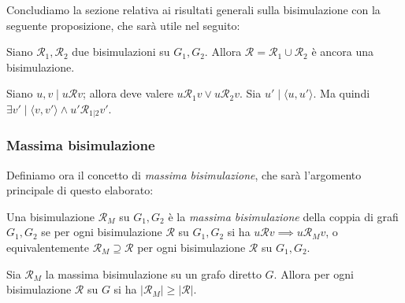 Concludiamo la sezione relativa ai risultati generali sulla bisimulazione con la seguente proposizione, che sarà utile nel seguito:
\begin{proposition}
    Siano $\mathcal{R}_1, \mathcal{R}_2$ due bisimulazioni su $G_1, G_2$. Allora $\mathcal{R} = \mathcal{R}_1 \cup \mathcal{R}_2$ è ancora una bisimulazione.
    \label{obs:bisimulation_union}
\end{proposition}
\begin{proof2}
    Siano $u,v \mid u \mathcal{R} v$; allora deve valere $u \mathcal{R}_1 v \lor u \mathcal{R}_2 v$. Sia $u' \mid \langle u, u' \rangle$. Ma quindi $\exists v' \mid \langle v,v' \rangle \land u' \mathcal{R}_{1|2} v'$.
\end{proof2}

\subsubsection{Massima bisimulazione}
\label{sec:bisi_max}
Definiamo ora il concetto di \emph{massima bisimulazione}, che sarà l'argomento principale di questo elaborato:
\begin{definition}
    Una bisimulazione $\mathcal{R}_M$ su $G_1, G_2$ è la \emph{massima bisimulazione} della coppia di grafi $G_1, G_2$ se per ogni bisimulazione $\mathcal{R}$ su $G_1,G_2$ si ha $u \mathcal{R} v \implies u \mathcal{R}_M v$, o equivalentemente $\mathcal{R}_M \supseteq \mathcal{R}$ per ogni bisimulazione $\mathcal{R}$ su $G_1, G_2$.
\end{definition}

\begin{observation}
    Sia $\mathcal{R}_M$ la massima bisimulazione su un grafo diretto $G$. Allora per ogni bisimulazione $\mathcal{R}$ su $G$ si ha $|\mathcal{R}_M| \geq |\mathcal{R}|$.
\end{observation}

